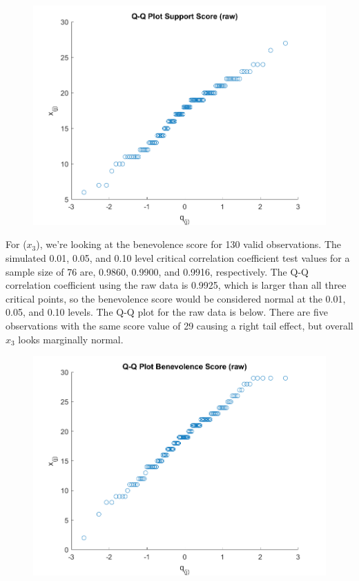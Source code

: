 \begin{enumerate}[label= (\alph*)]
    \begin{center}
        \begin{figure}[H]
            \centering
            \includegraphics[scale=0.6]{./matlab/chapter-4/sol4.39.qq.2.png}
        \end{figure}
    \end{center}

    For ($x_{3}$), we're looking at the benevolence score for 130 valid observations.
    The simulated 0.01, 0.05, and 0.10 level critical correlation coefficient test values for a sample size of 76 are, 0.9860, 0.9900, and 0.9916, respectively.
    The Q-Q correlation coefficient using the raw data is 0.9925, which is larger than all three critical points, so the benevolence score would be considered normal at the 0.01, 0.05, and 0.10 levels. 
    The Q-Q plot for the raw data is below.
    There are five observations with the same score value of 29 causing a right tail effect, but overall $x_{3}$ looks marginally normal.

    \begin{center}
        \begin{figure}[H]
            \centering
            \includegraphics[scale=0.6]{./matlab/chapter-4/sol4.39.qq.3.png}
        \end{figure}
    \end{center}


\end{enumerate}
